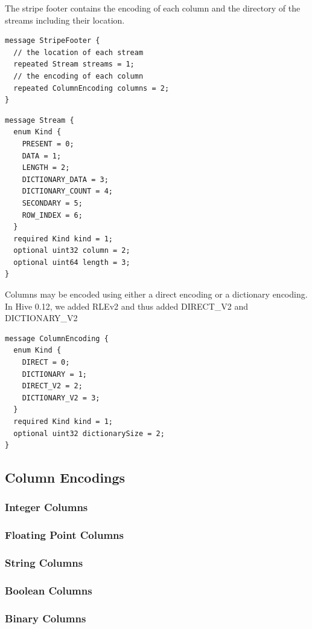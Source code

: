 \documentclass{article}
\begin{document}
The stripe footer contains the encoding of each column and the
directory of the streams including their location.

\begin{verbatim}
message StripeFooter {
  // the location of each stream
  repeated Stream streams = 1;
  // the encoding of each column
  repeated ColumnEncoding columns = 2;
}
\end{verbatim}

\begin{verbatim}
message Stream {
  enum Kind {
    PRESENT = 0;
    DATA = 1;
    LENGTH = 2;
    DICTIONARY_DATA = 3;
    DICTIONARY_COUNT = 4;
    SECONDARY = 5;
    ROW_INDEX = 6;
  }
  required Kind kind = 1;
  optional uint32 column = 2;
  optional uint64 length = 3;
}
\end{verbatim}

Columns may be encoded using either a direct encoding or a dictionary
encoding. In Hive 0.12, we added RLEv2 and thus added DIRECT\_V2 and
DICTIONARY\_V2

\begin{verbatim}
message ColumnEncoding {
  enum Kind {
    DIRECT = 0;
    DICTIONARY = 1;
    DIRECT_V2 = 2;
    DICTIONARY_V2 = 3;
  }
  required Kind kind = 1;
  optional uint32 dictionarySize = 2;
}
\end{verbatim}

\subsection{Column Encodings}

\subsubsection{Integer Columns}

\subsubsection{Floating Point Columns}

\subsubsection{String Columns}

\subsubsection{Boolean Columns}
\subsubsection{Binary Columns}
\end{document}
